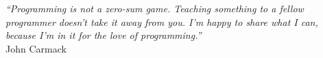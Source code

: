 \cleardoublepage
\thispagestyle{plain}

\vspace*{8cm}

\begin{flushright}
   \textsl{``Programming is not a zero-sum game. Teaching something to a fellow programmer doesn't take it away from you. I'm happy to share what I can, because I'm in it for the love of programming.''} \\
\vspace*{1.5cm}
John Carmack
\end{flushright}
